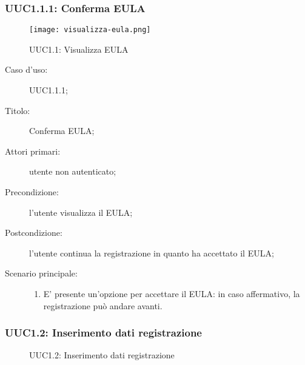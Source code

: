 \documentclass[../../../analisi-dei-requisiti.tex]{subfiles}
\begin{document}
\subsubsection{UUC1.1.1: Conferma EULA}%
\label{subs:UUC1.1.1}

\begin{figure}[H]
  \centering
  \texttt{[image: visualizza-eula.png]}
  \caption{UUC1.1: Visualizza EULA}%
  \label{fig:uuc1.1}
\end{figure}


\begin{description}
  \item[Caso d’uso:] UUC1.1.1;
  \item[Titolo:] Conferma EULA\@;
  \item[Attori primari:] utente non autenticato;
  \item[Precondizione:] l'utente visualizza il EULA\@;
  \item[Postcondizione:] l'utente continua la registrazione in quanto ha accettato il EULA\@;
  \item[Scenario principale:]
        \begin{enumerate}
          \item E' presente un'opzione per accettare il EULA\@: in caso affermativo, la registrazione può andare avanti.
        \end{enumerate}
\end{description}

\subsubsection{UUC1.2: Inserimento dati registrazione}%
\label{subs:UUC1.2}

\begin{figure}[H]
  \centering
  \caption{UUC1.2: Inserimento dati registrazione}%
  \label{fig:uuc1_2}
\end{figure}
\end{document}
